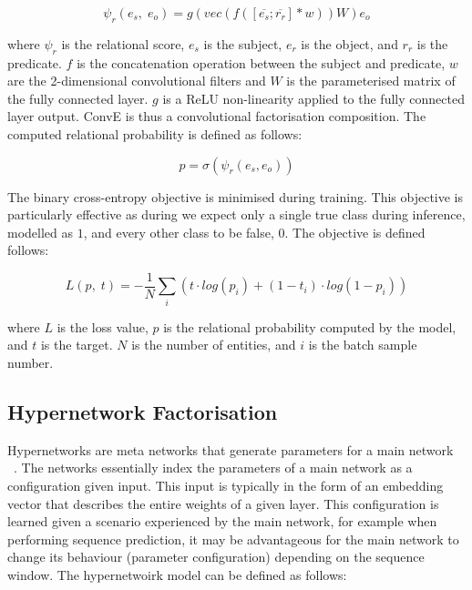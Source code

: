 \begin{equation}
	\psi_r(e_s, \; e_o) = g(vec(f(\left [ \overline{e_s}; \overline{r_r} \right ]*w))W)e_o
\end{equation}

where $\psi_r$ is the relational score, $e_s$ is the subject, $e_r$ is the object, and $r_r$ is the predicate. $f$ is the concatenation operation between the subject and predicate, $w$ are the 2-dimensional convolutional filters and $W$ is the parameterised matrix of the fully connected layer. $g$ is a ReLU non-linearity applied to the fully connected layer output. ConvE is thus a convolutional factorisation composition. The computed relational probability is defined as follows: 

\begin{equation}
	p = \sigma(\psi_r(e_s,e_o)) 
\end{equation}

The binary cross-entropy objective is minimised during training. This objective is particularly effective as during we expect only a single true class during inference, modelled as $1$, and every other class to be false, $0$. The objective is defined follows:

\begin{equation}
	L(p, \; t) =  -\frac{1}{N}\sum_i(t \cdot log(p_i) + (1 - t_i) \cdot log(1 - p_i))
\end{equation}

where $L$ is the loss value, $p$ is the relational probability computed by the model, and $t$ is the target. $N$ is the number of entities, and $i$ is the batch sample number. \newpage

\subsection{Hypernetwork Factorisation}

Hypernetworks are meta networks that generate parameters for a main network ~\citep{ha2016hypernetworks}. The networks essentially index the parameters of a main network as a configuration given input. This input is typically in the form of an embedding vector that describes the entire weights of a given layer. This configuration is learned given a scenario experienced by the main network, for example when performing sequence prediction, it may be advantageous for the main network to change its behaviour (parameter configuration) depending on the sequence window. The hypernetwoirk model can be defined as follows: 


